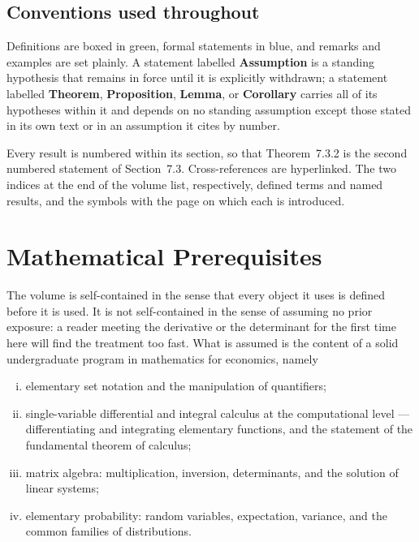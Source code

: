 \section*{Conventions used throughout}

Definitions are boxed in green, formal statements in blue, and remarks and
examples are set plainly. A statement labelled \textbf{Assumption} is a standing
hypothesis that remains in force until it is explicitly withdrawn; a statement
labelled \textbf{Theorem}, \textbf{Proposition}, \textbf{Lemma}, or
\textbf{Corollary} carries all of its hypotheses within it and depends on no
standing assumption except those stated in its own text or in an assumption it
cites by number.

Every result is numbered within its section, so that Theorem~7.3.2 is the second
numbered statement of Section~7.3. Cross-references are hyperlinked. The two
indices at the end of the volume list, respectively, defined terms and named
results, and the symbols with the page on which each is introduced.

\chapter*{Mathematical Prerequisites}

The volume is self-contained in the sense that every object it uses is defined
before it is used. It is not self-contained in the sense of assuming no prior
exposure: a reader meeting the derivative or the determinant for the first time
here will find the treatment too fast. What is assumed is the content of a solid
undergraduate program in mathematics for economics, namely

\begin{enumerate}[(i)]
	\item elementary set notation and the manipulation of quantifiers;
	\item single-variable differential and integral calculus at the computational
	      level --- differentiating and integrating elementary functions, and the
	      statement of the fundamental theorem of calculus;
	\item matrix algebra: multiplication, inversion, determinants, and the solution
	      of linear systems;
	\item elementary probability: random variables, expectation, variance, and the
	      common families of distributions.
\end{enumerate}

